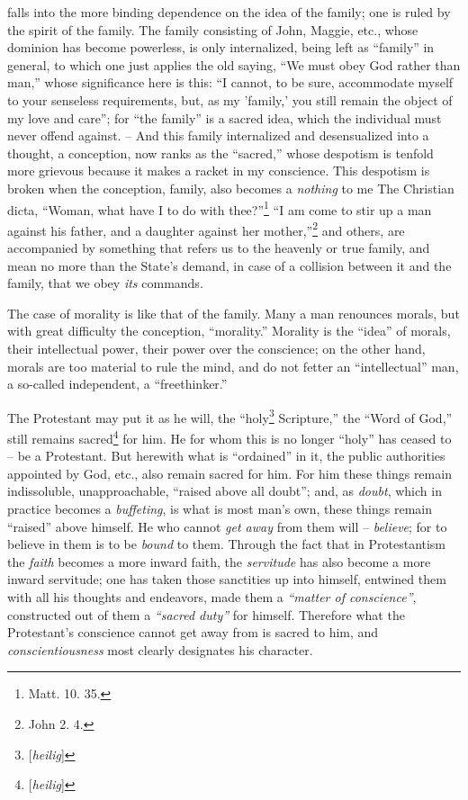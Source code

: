 \documentclass[12pt,a4paper]{book}
\begin{document}
falls into the more binding dependence on the idea of the family; one is ruled 
by the spirit of the family. The family consisting of John, Maggie, etc., 
whose dominion has become powerless, is only internalized, being left as 
``family'' in general, to which one just applies the old saying, ``We must 
obey God rather than man,'' whose significance here is this: ``I cannot, to 
be sure, accommodate myself to your senseless requirements, but, as my 
'family,' you still remain the object of my love and care''; for ``the 
family'' is a sacred idea, which the individual must never offend against. -- 
And this family internalized and desensualized into a thought, a conception, 
now ranks as the ``sacred,'' whose despotism is tenfold more grievous 
because it makes a racket in my conscience. This despotism is broken when the 
conception, family, also becomes a \textit{nothing} to me The Christian dicta, 
``Woman, what have I to do with thee?''\footnote{Matt. 10. 35.} ``I am come 
to stir up a man against his father, and a daughter against her 
mother,''\footnote{John 2. 4.} and others, are accompanied by something that 
refers us to the heavenly or true family, and mean no more than the State's 
demand, in case of a collision between it and the family, that we obey 
\textit{its} commands.

The case of morality is like that of the family. Many a man renounces morals, 
but with great difficulty the conception, ``morality.'' Morality is the 
``idea'' of morals, their intellectual power, their power over the 
conscience; on the other hand, morals are too material to rule the mind, and 
do not fetter an ``intellectual'' man, a so-called independent, a 
``freethinker.''

The Protestant may put it as he will, the ``holy\footnote{[\textit{heilig}]} 
Scripture,'' the ``Word of God,'' still remains 
sacred\footnote{[\textit{heilig}]} for him. He for whom this is no longer 
``holy'' has ceased to -- be a Protestant. But herewith what is 
``ordained'' in it, the public authorities appointed by God, etc., also 
remain sacred for him. For him these things remain indissoluble, 
unapproachable, ``raised above all doubt''; and, as \textit{doubt}, which in 
practice becomes a \textit{buffeting}, is what is most man's own, these things 
remain ``raised'' above himself. He who cannot \textit{get away} from them 
will -- \textit{believe}; for to believe in them is to be \textit{bound} to 
them. Through the fact that in Protestantism the \textit{faith} becomes a more 
inward faith, the \textit{servitude} has also become a more inward servitude; 
one has taken those sanctities up into himself, entwined them with all his 
thoughts and endeavors, made them a \textit{``matter of conscience''}, 
constructed out of them a \textit{``sacred duty''} for himself. Therefore 
what the Protestant's conscience cannot get away from is sacred to him, and 
\textit{conscientiousness} most clearly designates his character.
\end{document}
